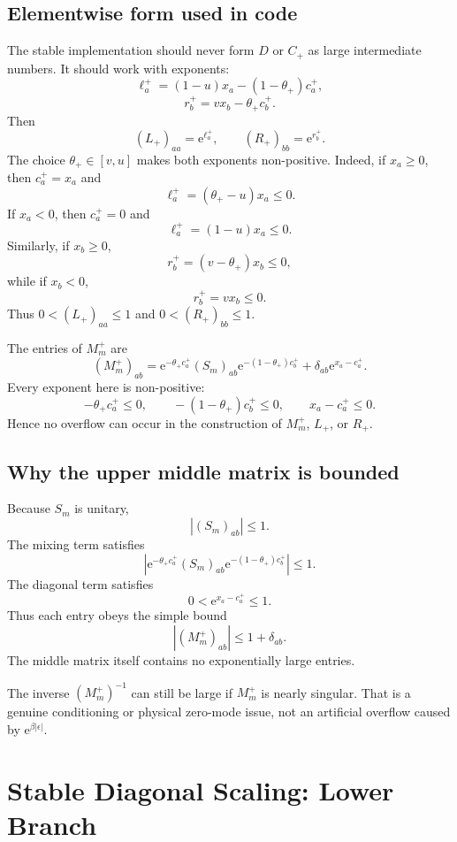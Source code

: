 \documentclass[11pt]{article}
\newcommand{\e}{\mathrm{e}}
\newcommand{\1}{\mathbb{1}}
\newcommand{\abs}[1]{\left|#1\right|}
\begin{document}
\subsection{Elementwise form used in code}

The stable implementation should never form \(D\) or \(C_+\) as large
intermediate numbers.  It should work with exponents:
\[
    \ell_a^+
    =
    (1-u)x_a-(1-\theta_+)c_a^+,
\]
\[
    r_b^+
    =
    vx_b-\theta_+ c_b^+.
\]
Then
\[
    (L_+)_{aa}=\e^{\ell_a^+},
    \qquad
    (R_+)_{bb}=\e^{r_b^+}.
\]
The choice \(\theta_+\in[v,u]\) makes both exponents non-positive.
Indeed, if \(x_a\ge 0\), then \(c_a^+=x_a\) and
\[
    \ell_a^+=(\theta_+-u)x_a\le 0.
\]
If \(x_a<0\), then \(c_a^+=0\) and
\[
    \ell_a^+=(1-u)x_a\le 0.
\]
Similarly, if \(x_b\ge 0\),
\[
    r_b^+=(v-\theta_+)x_b\le 0,
\]
while if \(x_b<0\),
\[
    r_b^+=vx_b\le 0.
\]
Thus \(0<(L_+)_{aa}\le 1\) and \(0<(R_+)_{bb}\le 1\).

The entries of \(M_m^+\) are
\[
    \boxed{
    (M_m^+)_{ab}
    =
    \e^{-\theta_+ c_a^+}
    (S_m)_{ab}
    \e^{-(1-\theta_+)c_b^+}
    +
    \delta_{ab}\e^{x_a-c_a^+}.
    }
\]
Every exponent here is non-positive:
\[
    -\theta_+c_a^+\le 0,
    \qquad
    -(1-\theta_+)c_b^+\le 0,
    \qquad
    x_a-c_a^+\le 0.
\]
Hence no overflow can occur in the construction of \(M_m^+\), \(L_+\), or
\(R_+\).

\subsection{Why the upper middle matrix is bounded}

Because \(S_m\) is unitary,
\[
    \abs{(S_m)_{ab}}\le 1.
\]
The mixing term satisfies
\[
    \abs{
    \e^{-\theta_+ c_a^+}
    (S_m)_{ab}
    \e^{-(1-\theta_+)c_b^+}
    }
    \le 1.
\]
The diagonal term satisfies
\[
    0<\e^{x_a-c_a^+}\le 1.
\]
Thus each entry obeys the simple bound
\[
    \abs{(M_m^+)_{ab}}\le 1+\delta_{ab}.
\]
The middle matrix itself contains no exponentially large entries.

The inverse \((M_m^+)^{-1}\) can still be large if \(M_m^+\) is nearly
singular.  That is a genuine conditioning or physical zero-mode issue, not
an artificial overflow caused by \(\e^{\beta\abs{\epsilon}}\).

\section{Stable Diagonal Scaling: Lower Branch}
\end{document}
